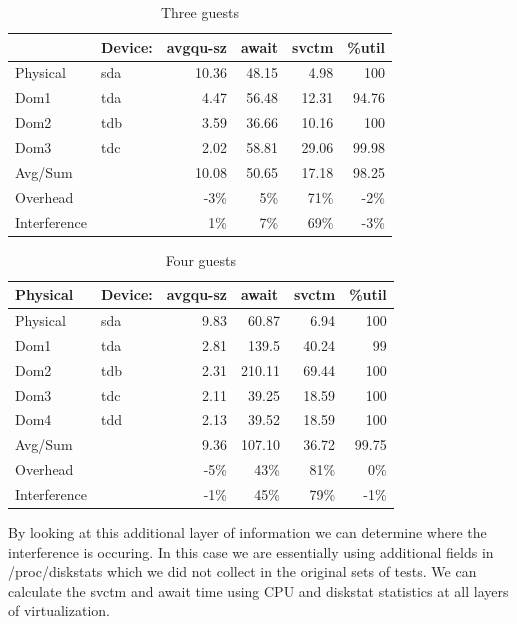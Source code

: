 \begin{table}[htbp]
\begin{tabular}{|l|l|r|r|r|r|}
\hline
 & Device: & \multicolumn{1}{l|}{avgqu-sz} & \multicolumn{1}{l|}{await} & \multicolumn{1}{l|}{svctm} & \multicolumn{1}{l|}{\%util} \\ \hline
Physical & sda & 10.36 & 48.15 & 4.98 & 100 \\ \hline
Dom1 & tda & 4.47 & 56.48 & 12.31 & 94.76 \\ \hline
Dom2 & tdb & 3.59 & 36.66 & 10.16 & 100 \\ \hline
Dom3 & tdc & 2.02 & 58.81 & 29.06 & 99.98 \\ \hline
Avg/Sum &  & 10.08 & 50.65 & 17.18 & 98.25 \\ \hline
Overhead &  & -3\% & 5\% & 71\% & -2\% \\ \hline
Interference &  & 1\% & 7\% & 69\% & -3\% \\ \hline
\end{tabular}
\caption{Three guests}
\label{3guest}
\end{table}

\begin{table}[htbp]
\begin{tabular}{|l|l|r|r|r|r|}
\hline
Physical & Device: & \multicolumn{1}{l|}{avgqu-sz} & \multicolumn{1}{l|}{await} & \multicolumn{1}{l|}{svctm} & \multicolumn{1}{l|}{\%util} \\ \hline
Physical & sda & 9.83 & 60.87 & 6.94 & 100 \\ \hline
Dom1 & tda & 2.81 & 139.5 & 40.24 & 99 \\ \hline
Dom2 & tdb & 2.31 & 210.11 & 69.44 & 100 \\ \hline
Dom3 & tdc & 2.11 & 39.25 & 18.59 & 100 \\ \hline
Dom4 & tdd & 2.13 & 39.52 & 18.59 & 100 \\ \hline
Avg/Sum &  & 9.36 & 107.10 & 36.72 & 99.75 \\ \hline
Overhead &  & -5\% & 43\% & 81\% & 0\% \\ \hline
Interference &  & -1\% & 45\% & 79\% & -1\% \\ \hline
\end{tabular}
\caption{Four guests}
\label{4guest}
\end{table}

By looking at this additional layer of information we can determine where the interference is occuring.  In this case we are essentially using additional fields in /proc/diskstats which we did not collect in the original sets of tests.  We can calculate the svctm and await time using CPU and diskstat statistics at all layers of virtualization.

